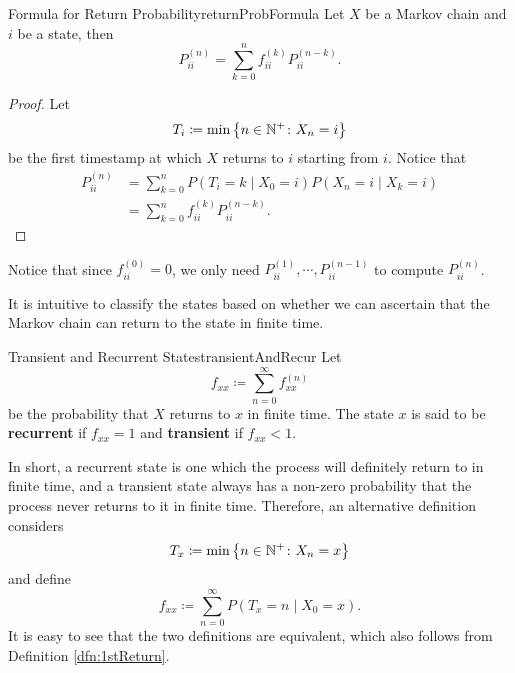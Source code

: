 \documentclass[math, code]{amznotes}
\theoremstyle{remark}
\begin{document}
\begin{thmbox}{Formula for Return Probability}{returnProbFormula}
    Let $X$ be a Markov chain and $i$ be a state, then 
    \begin{equation*}
        P_{ii}^{\left(n\right)} = \sum_{k = 0}^{n}f_{ii}^{\left(k\right)}P_{ii}^{\left(n - k\right)}.
    \end{equation*}
    \tcblower
    \begin{proof}
        Let 
        \begin{equation*}
            T_i \coloneqq \min\left\{n \in \mathbb{N}^+ \colon X_n = i\right\}
        \end{equation*}
        be the first timestamp at which $X$ returns to $i$ starting from $i$. Notice that 
        \begin{align*}
            P_{ii}^{\left(n\right)} & = \sum_{k = 0}^{n}P\left(T_i = k \mid X_0 = i\right)P\left(X_n = i \mid X_k = i\right) \\
            & = \sum_{k = 0}^{n}f_{ii}^{\left(k\right)}P_{ii}^{\left(n - k\right)}.
        \end{align*}
    \end{proof}
\end{thmbox}
Notice that since $f_{ii}^{\left(0\right)} = 0$, we only need $P_{ii}^{\left(1\right)}, \cdots, P_{ii}^{\left(n - 1\right)}$ to compute $P_{ii}^{\left(n\right)}$.

It is intuitive to classify the states based on whether we can ascertain that the Markov chain can return to the state in finite time.
\begin{dfnbox}{Transient and Recurrent States}{transientAndRecur}
    Let 
    \begin{equation*}
        f_{xx} \coloneqq \sum_{n = 0}^{\infty}f^{\left(n\right)}_{xx}
    \end{equation*}
    be the probability that $X$ returns to $x$ in finite time. The state $x$ is said to be {\color{red} \textbf{recurrent}} if $f_{xx} = 1$ and {\color{red} \textbf{transient}} if $f_{xx} < 1$.
\end{dfnbox}
In short, a recurrent state is one which the process will definitely return to in finite time, and a transient state always has a non-zero probability that the process never returns to it in finite time. Therefore, an alternative definition considers 
\begin{equation*}
    T_x \coloneqq \min\left\{n \in \mathbb{N}^+ \colon X_n = x\right\}
\end{equation*}
and define
\begin{equation*}
    f_{xx} \coloneqq \sum_{n = 0}^{\infty}P\left(T_x = n \mid X_0 = x\right).
\end{equation*}
It is easy to see that the two definitions are equivalent, which also follows from Definition \ref{dfn:1stReturn}.
\end{document}
